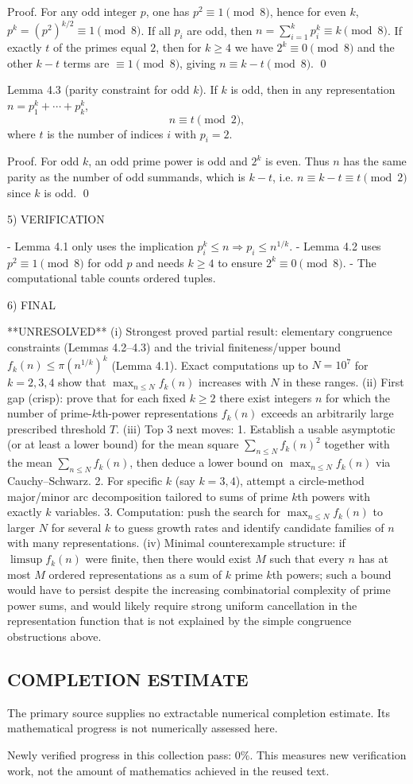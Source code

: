 Proof.
For any odd integer $p$, one has $p^2\equiv 1\pmod 8$, hence for even $k$,
$p^k=(p^2)^{k/2}\equiv 1\pmod 8$.
If all $p_i$ are odd, then $n=\sum_{i=1}^k p_i^k\equiv k\pmod 8$.
If exactly $t$ of the primes equal $2$, then for $k\ge 4$ we have $2^k\equiv 0\pmod 8$ and the other $k-t$ terms are $\equiv 1\pmod 8$, giving $n\equiv k-t\pmod 8$. \qed

Lemma 4.3 (parity constraint for odd $k$).
If $k$ is odd, then in any representation $n=p_1^k+\cdots+p_k^k$,
\[
n\equiv t\pmod 2,
\]
where $t$ is the number of indices $i$ with $p_i=2$.

Proof.
For odd $k$, an odd prime power is odd and $2^k$ is even. Thus $n$ has the same parity as the number of odd summands, which is $k-t$, i.e. $n\equiv k-t\equiv t\pmod 2$ since $k$ is odd. \qed

5) VERIFICATION

- Lemma 4.1 only uses the implication $p_i^k\le n\Rightarrow p_i\le n^{1/k}$.
- Lemma 4.2 uses $p^2\equiv 1\pmod 8$ for odd $p$ and needs $k\ge 4$ to ensure $2^k\equiv 0\pmod 8$.
- The computational table counts ordered tuples.

6) FINAL

**UNRESOLVED**
(i) Strongest proved partial result: elementary congruence constraints (Lemmas 4.2--4.3) and the trivial finiteness/upper bound $f_k(n)\le \pi(n^{1/k})^k$ (Lemma 4.1). Exact computations up to $N=10^7$ for $k=2,3,4$ show that $\max_{n\le N} f_k(n)$ increases with $N$ in these ranges.
(ii) First gap (crisp): prove that for each fixed $k\ge 2$ there exist integers $n$ for which the number of prime-$k$th-power representations $f_k(n)$ exceeds an arbitrarily large prescribed threshold $T$.
(iii) Top 3 next moves:
  1. Establish a usable asymptotic (or at least a lower bound) for the mean square $\sum_{n\le N} f_k(n)^2$ together with the mean $\sum_{n\le N} f_k(n)$, then deduce a lower bound on $\max_{n\le N} f_k(n)$ via Cauchy--Schwarz.
  2. For specific $k$ (say $k=3,4$), attempt a circle-method major/minor arc decomposition tailored to sums of prime $k$th powers with exactly $k$ variables.
  3. Computation: push the search for $\max_{n\le N} f_k(n)$ to larger $N$ for several $k$ to guess growth rates and identify candidate families of $n$ with many representations.
(iv) Minimal counterexample structure: if $\limsup f_k(n)$ were finite, then there would exist $M$ such that every $n$ has at most $M$ ordered representations as a sum of $k$ prime $k$th powers; such a bound would have to persist despite the increasing combinatorial complexity of prime power sums, and would likely require strong uniform cancellation in the representation function that is not explained by the simple congruence obstructions above.




\subsection*{COMPLETION ESTIMATE}
The primary source supplies no extractable numerical completion estimate. Its mathematical progress is not numerically assessed here.

Newly verified progress in this collection pass: $0\%$. This measures new verification work, not the amount of mathematics achieved in the reused text.
